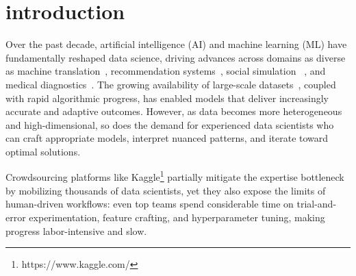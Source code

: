 \section{introduction}
Over the past decade, artificial intelligence (AI) and machine learning (ML) have fundamentally reshaped data science, driving advances across domains as diverse as machine translation~\citep{isikscaling}, recommendation systems~\citep{yuan2025contextgnn}, social simulation ~\citep{yang2025twinmarket}, and medical diagnostics~\citep{sepehrimediconfusion}.
The growing availability of large-scale datasets~\citep{ghorbaniscaling}, coupled with rapid algorithmic progress, has enabled models that deliver increasingly accurate and adaptive outcomes.
However, as data becomes more heterogeneous and high-dimensional, so does the demand for experienced data scientists who can craft appropriate models, interpret nuanced patterns, and iterate toward optimal solutions.


Crowdsourcing platforms like Kaggle\footnote{https://www.kaggle.com/} partially mitigate the expertise bottleneck by mobilizing thousands of data scientists, yet they also expose the limits of human-driven workflows: even top teams spend considerable time on trial-and-error experimentation, feature crafting, and hyperparameter tuning, making progress labor-intensive and slow.


